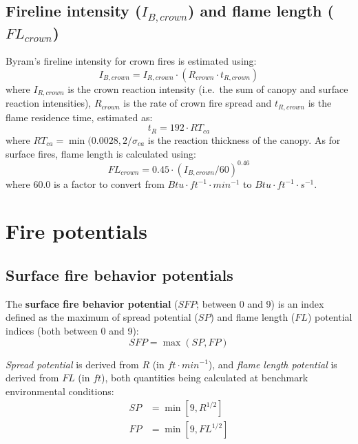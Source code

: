 \documentclass[]{book}
\begin{document}
\hypertarget{fireline-intensity-i_bcrown-and-flame-length-fl_crown}{%
\subsection{\texorpdfstring{Fireline intensity (\(I_{B,crown}\)) and flame length (\(FL_{crown}\))}{Fireline intensity (I\_\{B,crown\}) and flame length (FL\_\{crown\})}}\label{fireline-intensity-i_bcrown-and-flame-length-fl_crown}}

Byram's fireline intensity for crown fires is estimated using:
\begin{equation}
I_{B,crown} = I_{R,crown} \cdot (R_{crown} \cdot t_{R,crown})
\end{equation}
where \(I_{R,crown}\) is the crown reaction intensity (i.e.~the sum of canopy and surface reaction intensities), \(R_{crown}\) is the rate of crown fire spread and \(t_{R,crown}\) is the flame residence time, estimated as:
\begin{equation}
t_R = 192 \cdot RT_{ca}
\end{equation}
where \(RT_{ca} = \min(0.0028, 2/\sigma_{ca}\) is the reaction thickness of the canopy. As for surface fires, flame length is calculated using:
\begin{equation}
FL_{crown} = 0.45 \cdot (I_{B,crown}/60)^{0.46}
\end{equation}
where 60.0 is a factor to convert from \(Btu\cdot ft^{-1} \cdot min^{-1}\) to \(Btu\cdot ft^{-1} \cdot s^{-1}\).

\hypertarget{fire-potentials}{%
\section{Fire potentials}\label{fire-potentials}}

\hypertarget{surface-fire-behavior-potentials}{%
\subsection{Surface fire behavior potentials}\label{surface-fire-behavior-potentials}}

The \textbf{surface fire behavior potential} (\(SFP\); between 0 and 9) is an index defined as the maximum of spread potential (\(SP\)) and flame length (\(FL\)) potential indices (both between 0 and 9):
\begin{equation}
SFP = \max(SP, FP)
\end{equation}

\emph{Spread potential} is derived from \(R\) (in \(ft\cdot min^{-1}\)), and \emph{flame length potential} is derived from \(FL\) (in \(ft\)), both quantities being calculated at benchmark environmental conditions:
\begin{eqnarray}
SP &= \min \left[ 9, R^{1/2}\right] \\
FP &= \min \left[ 9, FL^{1/2}\right] 
\end{eqnarray}
\end{document}
